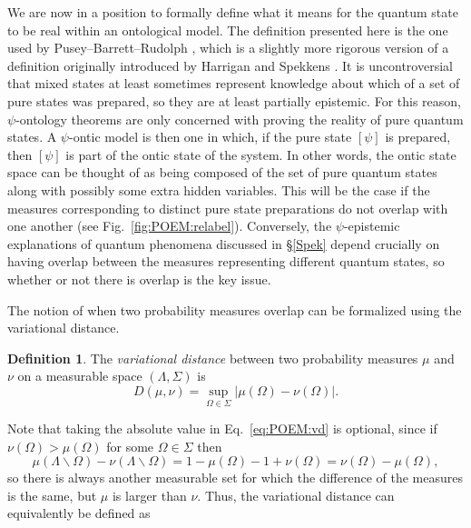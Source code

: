 \documentclass[DIV=calc,fontsize=12pt]{scrartcl} %
\theoremstyle{definition}
\newtheorem{definition}{Definition}[section]
\theoremstyle{plain}
\newcommand{\Proj}[1]{\ensuremath{\left [ #1 \right ]}}
\begin{document}
We are now in a position to formally define what it means for the
quantum state to be real within an ontological model.  The definition
presented here is the one used by Pusey--Barrett--Rudolph \cite{Pusey2012}, which is a
slightly more rigorous version of a definition originally introduced
by Harrigan and Spekkens \cite{Harrigan2010}.  It is uncontroversial
that mixed states at least sometimes represent knowledge about which
of a set of pure states was prepared, so they are at least partially
epistemic.  For this reason, $\psi$-ontology theorems are only
concerned with proving the reality of pure quantum states.  A
$\psi$-ontic model is then one in which, if the pure state
$\Proj{\psi}$ is prepared, then $\Proj{\psi}$ is part of the ontic
state of the system.  In other words, the ontic state space can be
thought of as being composed of the set of pure quantum states along
with possibly some extra hidden variables.  This will be the case if
the measures corresponding to distinct pure state preparations do not
overlap with one another (see Fig.~\ref{fig:POEM:relabel}).
Conversely, the $\psi$-epistemic explanations of quantum phenomena
discussed in \S\ref{Spek} depend crucially on having overlap between
the measures representing different quantum states, so whether or not
there is overlap is the key issue.


The notion of when two probability measures overlap can be formalized
using the variational distance.
\begin{definition}
\label{def:POEM:vd}
The \emph{variational distance} between two probability measures
$\mu$ and $\nu$ on a measurable space $(\Lambda, \Sigma)$ is
\begin{equation}
\label{eq:POEM:vd}
D(\mu,\nu) = \sup_{\Omega \in \Sigma} \left | \mu(\Omega) -
\nu(\Omega) \right |.
\end{equation}
\end{definition}


Note that taking the absolute value in Eq.~\eqref{eq:POEM:vd} is
optional, since if $\nu(\Omega) > \mu(\Omega)$ for some $\Omega \in
\Sigma$ then
\begin{equation}
\mu(\Lambda \backslash \Omega) - \nu(\Lambda \backslash \Omega) =
1 - \mu(\Omega) - 1 + \nu(\Omega) = \nu(\Omega) - \mu(\Omega),
\end{equation}
so there is always another measurable set for which the difference of
the measures is the same, but $\mu$ is larger than $\nu$.  Thus, the
variational distance can equivalently be defined as
\end{document}
